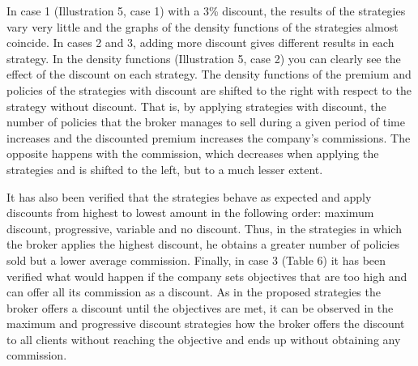 \documentclass[review]{elsarticle}
\begin{document}
In case 1 (Illustration 5, case 1) with a 3\% discount, the results of the strategies vary very little and the graphs of the density functions of the strategies almost coincide.
In cases 2 and 3, adding more discount gives different results in each strategy. In the density functions (Illustration 5, case 2) you can clearly see the effect of the discount on each strategy. The density functions of the premium and policies of the strategies with discount are shifted to the right with respect to the strategy without discount. That is, by applying strategies with discount, the number of policies that the broker manages to sell during a given period of time increases and the discounted premium increases the company's commissions. The opposite happens with the commission, which decreases when applying the strategies and is shifted to the left, but to a much lesser extent.

It has also been verified that the strategies behave as expected and apply discounts from highest to lowest amount in the following order: maximum discount, progressive, variable and no discount. Thus, in the strategies in which the broker applies the highest discount, he obtains a greater number of policies sold but a lower average commission.
Finally, in case 3 (Table 6) it has been verified what would happen if the company sets objectives that are too high and can offer all its commission as a discount.
As in the proposed strategies the broker offers a discount until the objectives are met, it can be observed in the maximum and progressive discount strategies how the broker offers the discount to all clients without reaching the objective and ends up without obtaining any commission.
\end{document}
